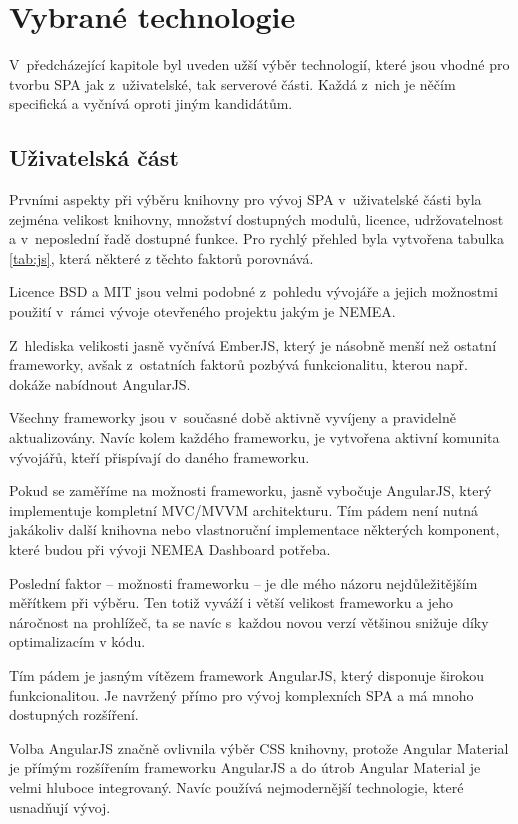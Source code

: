 \section{Vybrané technologie}

V~předcházející kapitole byl uveden užší výběr technologií, které jsou vhodné pro tvorbu SPA jak z~uživatelské, tak serverové části. Každá z~nich je něčím specifická a vyčnívá oproti jiným kandidátům.

\subsection{Uživatelská část}

Prvními aspekty při výběru knihovny pro vývoj SPA v~uživatelské části byla zejména velikost knihovny, množství dostupných modulů, licence, udržovatelnost a v~neposlední řadě dostupné funkce. Pro rychlý přehled byla vytvořena tabulka \ref{tab:js}, která některé z těchto faktorů porovnává.

Licence BSD a MIT jsou velmi podobné z~pohledu vývojáře a jejich možnostmi použití v~rámci vývoje otevřeného projektu jakým je NEMEA.

Z~hlediska velikosti jasně vyčnívá EmberJS, který je násobně menší než ostatní frameworky, avšak z~ostatních faktorů pozbývá funkcionalitu, kterou např. dokáže nabídnout AngularJS.

Všechny frameworky jsou v~současné době aktivně vyvíjeny a pravidelně aktualizovány. Navíc kolem každého frameworku, je vytvořena aktivní komunita vývojářů, kteří přispívají do daného frameworku.

Pokud se zaměříme na možnosti frameworku, jasně vybočuje AngularJS, který implementuje kompletní MVC/MVVM architekturu. Tím pádem není nutná jakákoliv další knihovna nebo vlastnoruční implementace některých komponent, které budou při vývoji NEMEA Dashboard potřeba.

Poslední faktor -- možnosti frameworku -- je dle mého názoru nejdůležitějším měřítkem při výběru. Ten totiž vyváží i větší velikost frameworku a jeho náročnost na prohlížeč, ta se navíc s~každou novou verzí většinou snižuje díky optimalizacím v kódu.

Tím pádem je jasným vítězem framework AngularJS, který disponuje širokou funkcionalitou. Je navržený přímo pro vývoj komplexních SPA a má mnoho dostupných rozšíření.

Volba AngularJS značně ovlivnila výběr CSS knihovny, protože Angular Material je přímým rozšířením frameworku AngularJS a do útrob Angular Material je velmi hluboce integrovaný. Navíc používá nejmodernější technologie, které usnadňují vývoj.

